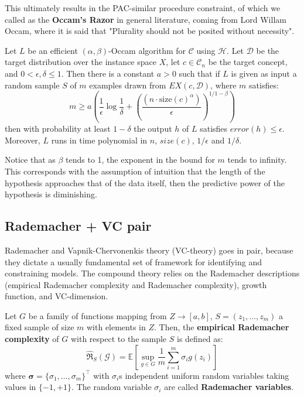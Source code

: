 \documentclass[twoside,10pt]{article}
\begin{document}
This ultimately results in the PAC-similar procedure constraint, of which we called as the \textbf{Occam's Razor} in general literature, coming from Lord Willam Occam, where it is said that "Plurality should not be posited without necessity". 
\begin{theorem}\label{eq:Occam1}
    Let $L$ be an efficient $(\alpha,\beta)$-Occam algorithm for $\mathcal{C}$ using $\mathcal{H}$. Let $\mathcal{D}$ be the target distribution over the instance space $X$, let $c\in \mathcal{C}_{n}$ be the target concept, and $0< \epsilon, \delta \leq 1$. Then there is a constant $a>0$ such that if $L$ is given as input a random sample $S$ of $m$ examples drawn from $EX(c,\mathcal{D})$, where $m$ satisfies: 
    \begin{equation}
        m \geq a \left( \frac{1}{\epsilon} \log{\frac{1}{\delta}} + \left(\frac{(n\cdot \mathrm{size}(c)^{\alpha})}{\epsilon}\right)^{1/1-\beta} \right)
    \end{equation}
    then with probability at least $1-\delta$ the output $h$ of $L$ satisfies $error(h)\leq \epsilon$. Moreover, $L$ runs in time polynomial in $n$, $size(c)$, $1/\epsilon$ and $1/\delta$.
\end{theorem}
Notice that as $\beta$ tends to 1, the exponent in the bound for $m$ tends to infinity. This corresponds with the assumption of intuition that the length of the hypothesis approaches that of the data itself, then the predictive power of the hypothesis is diminishing. 

\subsection{Rademacher + VC pair}

Rademacher and Vapnik-Chervonenkis theory (VC-theory) goes in pair, because they dictate a usually fundamental set of framework for identifying and constraining models. The compound theory relies on the Rademacher descriptions (empirical Rademacher complexity and Rademacher complexity), growth function, and VC-dimension. \cite{10.5555/2371238,STL_Hajek_Maxim_2021,10.5555/2930837}

Let $G$ be a family of functions mapping from $Z\to [a,b]$, $S=(z_1,\dots, z_m)$ a fixed sample of size $m$ with elements in $Z$. Then, the \textbf{empirical Rademacher complexity} of $G$ with respect to the sample $S$ is defined as:
\begin{equation*}
    \hat{\mathfrak{R}}_S (\mathcal{G}) = \mathbb{E} \left[ \sup_{g\in G} \frac{1}{m} \sum^{m}_{i=1} \sigma_i g(z_i) \right]
\end{equation*}
where $\bm{\sigma}=\{\sigma_1,\dots,\sigma_m\}^{\top}$ with $\sigma_i$s independent uniform random variables taking values in $\{-1,+1\}$. The random variable $\sigma_i$ are called \textbf{Rademacher variables}.
\end{document}
